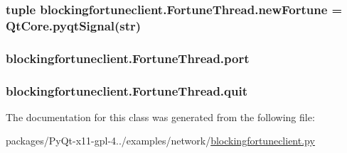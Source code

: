 \subsubsection[{new\+Fortune}]{\setlength{\rightskip}{0pt plus 5cm}tuple blockingfortuneclient.\+Fortune\+Thread.\+new\+Fortune = Qt\+Core.\+pyqt\+Signal(str)\hspace{0.3cm}{\ttfamily [static]}}\label{classblockingfortuneclient_1_1FortuneThread_a5aeb5046ecb6469bb23a088a548f39f5}
\hypertarget{classblockingfortuneclient_1_1FortuneThread_a7200c0ee4d24fbc8496f32ed701e1a29}{}
\subsubsection[{port}]{\setlength{\rightskip}{0pt plus 5cm}blockingfortuneclient.\+Fortune\+Thread.\+port}\label{classblockingfortuneclient_1_1FortuneThread_a7200c0ee4d24fbc8496f32ed701e1a29}
\hypertarget{classblockingfortuneclient_1_1FortuneThread_ab4d37bb3939a952811e52f50db1a443e}{}
\subsubsection[{quit}]{\setlength{\rightskip}{0pt plus 5cm}blockingfortuneclient.\+Fortune\+Thread.\+quit}\label{classblockingfortuneclient_1_1FortuneThread_ab4d37bb3939a952811e52f50db1a443e}


The documentation for this class was generated from the following file\+:\begin{DoxyCompactItemize}
\item 
packages/\+Py\+Qt-\/x11-\/gpl-\/4../examples/network/\hyperlink{blockingfortuneclient_8py}{blockingfortuneclient.\+py}\end{DoxyCompactItemize}
